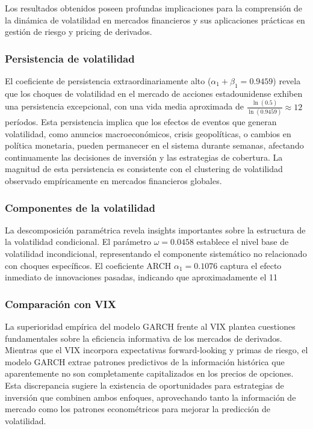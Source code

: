 Los resultados obtenidos poseen profundas implicaciones para la comprensión de la dinámica de volatilidad en mercados financieros y sus aplicaciones prácticas en gestión de riesgo y pricing de derivados.

\subsubsection{Persistencia de volatilidad}

El coeficiente de persistencia extraordinariamente alto ($\alpha_1 + \beta_1 = 0.9459$) revela que los choques de volatilidad en el mercado de acciones estadounidense exhiben una persistencia excepcional, con una vida media aproximada de $\frac{\ln(0.5)}{\ln(0.9459)} \approx 12$ períodos. Esta persistencia implica que los efectos de eventos que generan volatilidad, como anuncios macroeconómicos, crisis geopolíticas, o cambios en política monetaria, pueden permanecer en el sistema durante semanas, afectando continuamente las decisiones de inversión y las estrategias de cobertura. La magnitud de esta persistencia es consistente con el clustering de volatilidad observado empíricamente en mercados financieros globales.

\subsubsection{Componentes de la volatilidad}

La descomposición paramétrica revela insights importantes sobre la estructura de la volatilidad condicional. El parámetro $\omega = 0.0458$ establece el nivel base de volatilidad incondicional, representando el componente sistemático no relacionado con choques específicos. El coeficiente ARCH $\alpha_1 = 0.1076$ captura el efecto inmediato de innovaciones pasadas, indicando que aproximadamente el 11%

\subsubsection{Comparación con VIX}

La superioridad empírica del modelo GARCH frente al VIX plantea cuestiones fundamentales sobre la eficiencia informativa de los mercados de derivados. Mientras que el VIX incorpora expectativas forward-looking y primas de riesgo, el modelo GARCH extrae patrones predictivos de la información histórica que aparentemente no son completamente capitalizados en los precios de opciones. Esta discrepancia sugiere la existencia de oportunidades para estrategias de inversión que combinen ambos enfoques, aprovechando tanto la información de mercado como los patrones econométricos para mejorar la predicción de volatilidad.